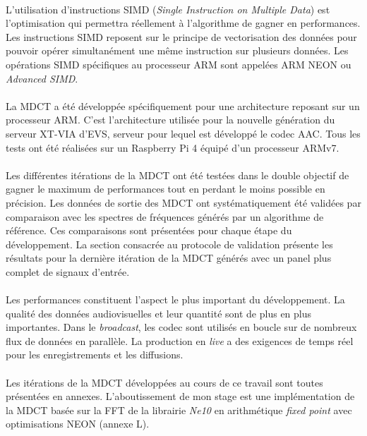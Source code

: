 \documentclass{article}
\begin{document}
    \paragraph{}
    L'utilisation d'instructions SIMD (\emph{Single Instruction on Multiple Data}) est l'optimisation qui permettra réellement à l'algorithme de gagner en performances. Les instructions SIMD reposent sur le principe de vectorisation des données pour pouvoir opérer simultanément une même instruction sur plusieurs données. Les opérations SIMD spécifiques au processeur ARM sont appelées ARM NEON ou \emph{Advanced SIMD}.

    \paragraph{}
    La MDCT a été développée spécifiquement pour une architecture reposant sur un processeur ARM. C'est l'architecture utilisée pour la nouvelle génération du serveur XT-VIA d'EVS, serveur pour lequel est développé le codec AAC. Tous les tests ont été réalisées sur un Raspberry Pi 4 équipé d'un processeur ARMv7.

    \paragraph{}
    Les différentes itérations de la MDCT ont été testées dans le double objectif de gagner le maximum de performances tout en perdant le moins possible en précision. Les données de sortie des MDCT ont systématiquement été validées par comparaison avec les spectres de fréquences générés par un algorithme de référence. Ces comparaisons sont présentées pour chaque étape du développement. La section consacrée au protocole de validation présente les résultats pour la dernière itération de la MDCT générés avec un panel plus complet de signaux d'entrée.

    \paragraph{}
    Les performances constituent l'aspect le plus important du développement. La qualité des données audiovisuelles et leur quantité sont de plus en plus importantes. Dans le \emph{broadcast}, les codec sont utilisés en boucle sur de nombreux flux de données en parallèle. La production en \emph{live} a des exigences de temps réel pour les enregistrements et les diffusions.

    \paragraph{}
    Les itérations de la MDCT développées au cours de ce travail sont toutes présentées en annexes. L'aboutissement de mon stage est une implémentation de la MDCT basée sur la FFT de la librairie \emph{Ne10} en arithmétique \emph{fixed point} avec optimisations NEON (annexe L).
\end{document}
